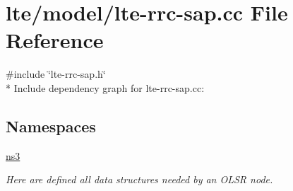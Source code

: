 \hypertarget{lte-rrc-sap_8cc}{}\section{lte/model/lte-\/rrc-\/sap.cc File Reference}
\label{lte-rrc-sap_8cc}
{\ttfamily \#include \char`\"{}lte-\/rrc-\/sap.\+h\char`\"{}}\\*
Include dependency graph for lte-\/rrc-\/sap.cc\+:
\subsection*{Namespaces}
\begin{DoxyCompactItemize}
\item 
 \hyperlink{namespacens3}{ns3}
\begin{DoxyCompactList}\small\item\em Here are defined all data structures needed by an O\+L\+SR node. \end{DoxyCompactList}\end{DoxyCompactItemize}
